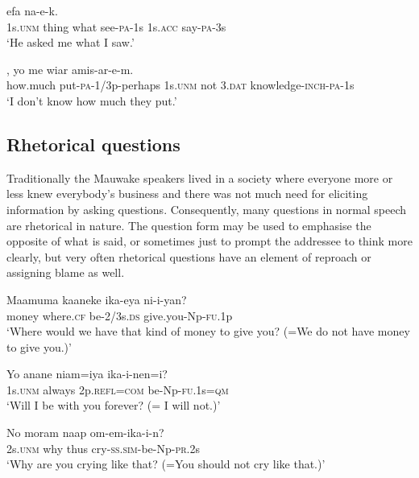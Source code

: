 \ea%
\label{ex:x1203}
  efa  na-e-k. \\
1s.\textsc{unm}  thing  what  see-\textsc{pa}-1s  1s.\textsc{acc}  say-\textsc{pa}-3s      \\
\glt `He asked me what I saw.'
\z





\ea%
\label{ex:x1204}
,  yo  me  wiar amis-ar-e-m. \\
how.much  put-\textsc{pa}-1/3p-perhaps  1s.\textsc{unm}  not  3.\textsc{dat} knowledge-\textsc{inch}-\textsc{pa}-1s     \\
\glt `I don't know how much they put.'
\z




\subsection{Rhetorical questions}
{}
Traditionally the Mauwake speakers lived in a society where everyone more or less knew everybody's business and there was not much need for eliciting information by asking questions. Consequently, many questions in normal speech are rhetorical in nature. The question form may be used to emphasise the opposite of what is said, or sometimes just to prompt the addressee to think more clearly, but very often rhetorical questions have an element of reproach or assigning blame as well.

\ea%
\label{ex:x1205}
\gll Maamuma  kaaneke  ika-eya  ni-i-yan? \\
 money  where.\textsc{cf}  be-2/3s.\textsc{ds}  give.you-Np-\textsc{fu}.1p     \\
\glt `Where would we have that kind of money to give you? (=We do not have money to give you.)'
\z





\ea%
\label{ex:x1206}
\gll Yo  anane  niam=iya  ika-i-nen=i? \\
1s.\textsc{unm}  always  2p.\textsc{refl}=\textsc{com}  be-Np-\textsc{fu}.1s=\textsc{qm}      \\
\glt `Will I be with you forever? (= I will not.)'
\z





\ea%
\label{ex:x1202}
\gll No  moram  naap  om-em-ika-i-n? \\
2s.\textsc{unm}  why  thus  cry-\textsc{ss}.\textsc{sim}-be-Np-\textsc{pr}.2s      \\
\glt `Why are you crying like that? (=You should not cry like that.)'
\z





